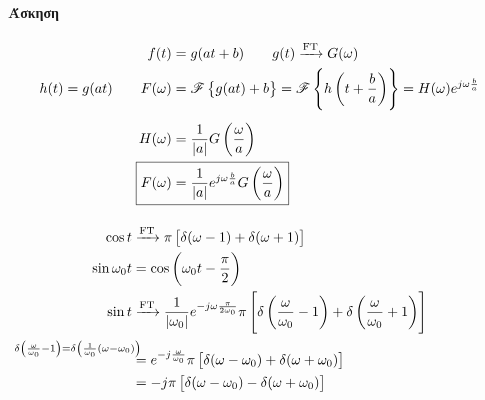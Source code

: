      \paragraph{Άσκηση}
     \begin{align*}
     f(t) &= g(at+b) \qquad g(t)\xrightarrow{\text{FT}}G(\omega ) \\
     h(t)=g(at) \qquad
     F(\omega ) &= \mathscr F\left\lbrace g(at)+b \right\rbrace
     = \mathscr F \left\lbrace h\left(t+\frac{b}{a}\right) \right\rbrace
     = H(\omega )e^{j\omega \frac{b}{a}} \\[5pt]
     H(\omega ) &= \frac{1}{|a|}G\left(\frac{\omega}{a}\right) \\
     \Aboxed{F(\omega ) &=
     \frac{1}{|a|}e^{j\omega\frac{b}{a}}G\left(\frac{\omega}{a}\right)}
     \end{align*}
     
     \paragraph{}
     \begin{align*}
     \cos t &\xrightarrow{\text{FT}} \pi\left[
     \delta(\omega -1)+\delta(\omega +1)
     \right] \\
     \sin \omega_0 t &= \cos\left(\omega_0t-\frac{\pi}{2}\right)
     \\
     \sin t &\xrightarrow{\text{FT}}
     \frac{1}{|\omega_0|}e^{-j\omega\frac{\pi}{2\omega_0}}\pi
     \left[ \delta\left(\frac{\omega}{\omega_0}-1\right)
     +\delta\left(\frac{\omega}{\omega_0} + 1\right)
      \right]
      \\ &\overset{\mathllap{\delta\left(\frac{\omega}{\omega_0}-1\right)
        = \delta\left(\frac{1}{\omega_0}(\omega-\omega_0)\right)}
        }{=}
        e^{-j\frac{\omega}{\omega_0}}\pi\left[
        \delta(\omega-\omega_0)+\delta(\omega +\omega_0)
        \right] \\ &= -j\pi\left[
        \delta(\omega -\omega_0)-\delta(\omega+\omega_0)
        \right]
     \end{align*}
     
     \paragraph{}
     \hspace{0pt}
     
     
